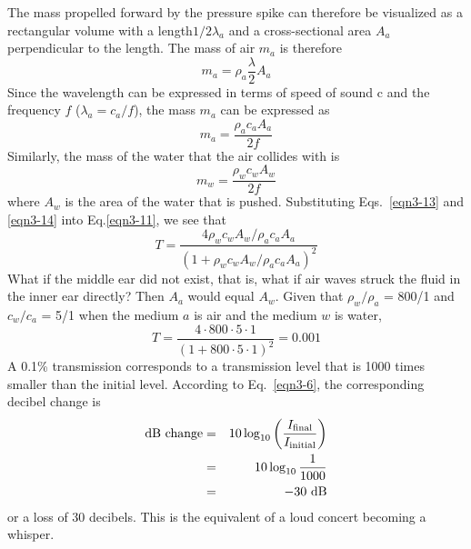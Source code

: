 The mass propelled forward by the pressure spike can therefore be visualized as a rectangular volume with a length$1/2\lambda_a$ and a cross-sectional area $A_a$ perpendicular to the length. The mass of air $m_a$ is therefore 
\begin{equation}\label{eqn3-12}
m_a = \rho_a \frac{\lambda}{2}A_a
\end{equation}
Since the wavelength can be expressed in terms of speed of sound c and the frequency $f$ ($\lambda_a=c_a/f$), the mass $m_a$ can be expressed as 
\begin{equation}\label{eqn3-13}
m_a = \frac{\rho_a c_a A_a}{2f}
\end{equation}
Similarly, the mass of the water that the air collides with is 
\begin{equation}\label{eqn3-14}
m_w = \frac{\rho_w c_w A_w}{2f}
\end{equation}
where $A_w$ is the area of the water that is pushed.  
Substituting Eqs.~\ref{eqn3-13} and \ref{eqn3-14} into Eq.\ref{eqn3-11}, we see that 
\begin{equation}\label{eqn3-15}
T = \frac{4\rho_w c_w A_w/\rho_a c_a A_a}{\left(1+\rho_w c_w A_w/\rho_a c_a A_a\right)^2}
\end{equation}
What if the middle ear did not exist, that is, what if air waves struck the fluid in the inner ear directly?  Then $A_a$ would equal $A_w$.  Given that $\rho_w/\rho_a$ = 800/1 and $c_w/c_a$ = 5/1 when the medium $a$ is air and the medium $w$ is water,
$$T = \frac{4\cdot 800\cdot 5\cdot 1}{\left(1+800\cdot5\cdot1\right)^2} = 0.001$$
A 0.1\% transmission corresponds to a transmission level that is 1000 times smaller than the initial level. According to Eq.~\ref{eqn3-6}, the corresponding decibel change is
\begin{eqnarray}
{\rm dB~change} &=& 10 \log_{10}\left(\frac{I_{\rm final}}{I_{\rm initial}}\right)\nonumber\\
&=& 10 \log_{10}\frac{1}{1000}\nonumber\\
&=& -30~{\rm dB}\nonumber
\end{eqnarray}
or a loss of 30 decibels. This is the equivalent of a loud concert becoming a whisper.

